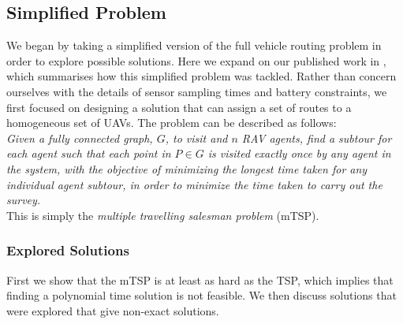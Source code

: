 \subsection{Simplified Problem}
We began by taking a simplified version of the full vehicle routing problem in order to explore possible solutions. Here we expand on our published work in \cite{Smyth2018UsingDrones}, which summarises how this simplified problem was tackled. Rather than concern ourselves with the details of sensor sampling times and battery constraints, we first focused on designing a solution that can assign a set of routes to a homogeneous set of UAVs. 
The problem can be described as follows:
\\
\textit{Given a fully connected graph, $G$, to visit and $n$ RAV agents, find a subtour for each agent such that each point in $P \in G$ is visited exactly once by any agent in the system, with the objective of minimizing the longest time taken for any individual agent subtour, in order to minimize the time taken to carry out the survey.}
\\
This is simply the \textit{multiple travelling salesman problem} (mTSP). 


\subsubsection{Explored Solutions}
First we show that the mTSP is at least as hard as the TSP, which implies that finding a polynomial time solution is not feasible. We then discuss solutions that were explored that give non-exact solutions. 

